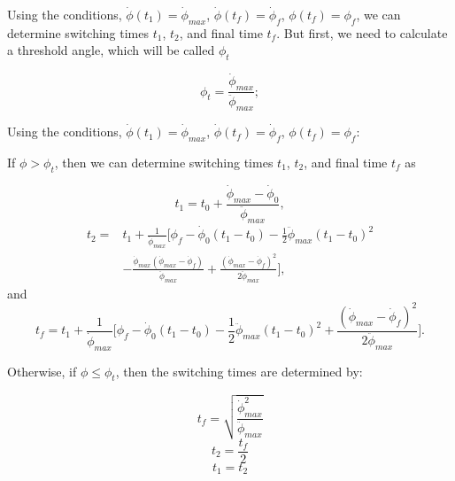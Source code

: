 \documentclass[letterpaper, paper,12pt]{AAS}		%
\begin{document}
	
	 Using the conditions, $\dot{\phi}(t_1)=\dot{\phi}_{max}$, $\dot{\phi}(t_f)=\dot{\phi}_f$, $\phi(t_f)=\phi_f$, we can determine switching times $t_1$, $t_2$, and final time $t_f$. But first, we need to calculate a threshold angle, which will be called $\phi_t$

	\begin{equation}\label{phi_t}
	\phi_t = \frac{\dot{\phi}_{max}}{\ddot{\phi}_{max}};
	\end{equation}
	
	Using the conditions, $\dot{\phi}(t_1)=\dot{\phi}_{max}$, $\dot{\phi}(t_f)=\dot{\phi}_f$, $\phi(t_f)=\phi_f$: 
	
	If $\phi > \phi_t$, then we can determine switching times $t_1$, $t_2$, and final time $t_f$ as
	
	\begin{equation}\label{t1cons}
	t_1=t_0+\frac{\dot{\phi}_{max}-\dot{\phi}_0}{\ddot{\phi}_{max}},
	\end{equation}
	\begin{equation}\label{t2cons}
	\begin{split}
	t_2=&t_1+\frac{1}{\dot{\phi}_{max}}\Big[ \phi_f-\dot{\phi}_0(t_1-t_0)-\frac{1}{2}\ddot{\phi}_{max}(t_1-t_0)^2\\
	&-\frac{\dot{\phi}_{max}(\dot{\phi}_{max}-\dot{\phi}_f)}{\ddot{\phi}_{max}}+\frac{(\dot{\phi}_{max}-\dot{\phi}_f)^2}{2\ddot{\phi}_{max}} \Big],
	\end{split}
	\end{equation}
	and
	\begin{equation}\label{tfcons}
	t_f=t_1+\frac{1}{\dot{\phi}_{max}}\Big[ \phi_f-\dot{\phi}_0(t_1-t_0)-\frac{1}{2}\ddot{\phi}_{max}(t_1-t_0)^2+\frac{(\dot{\phi}_{max}-\dot{\phi}_f)^2}{2\ddot{\phi}_{max}} \Big].
	\end{equation}
	
	Otherwise, if $\phi \leq \phi_t$, then the switching times are determined by: 
	
	\begin{equation}\label{tfcons_phit}
	t_f = \sqrt{\frac{\dot{\phi}_{max}^2}{\ddot{\phi}_{max}}}
	\end{equation}
	\begin{equation}\label{t2cons_phit}
	t_2 = \frac{t_f}{2}
	\end{equation}
	\begin{equation}\label{t1cons_phit}
	t_1 = t_2 
	\end{equation}
	
\end{document}

